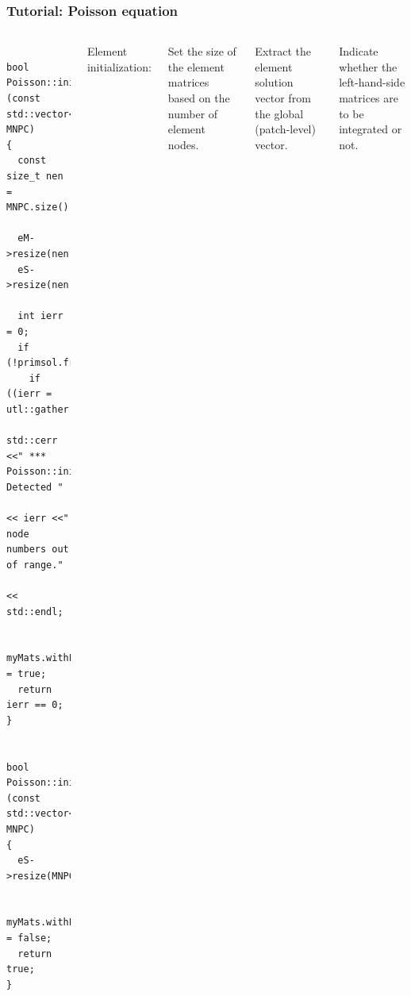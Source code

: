 \documentclass{beamer}
\begin{document}
\begin{frame}[fragile] %
 \frametitle{Tutorial: Poisson equation}

 \begin{columns}[c]
  \tiny\begin{verbatim}

bool Poisson::initElement (const std::vector<int>& MNPC)
{
  const size_t nen = MNPC.size();

  eM->resize(nen,nen,true);
  eS->resize(nen,true);

  int ierr = 0;
  if (!primsol.front().empty())
    if ((ierr = utl::gather(MNPC,1,primsol.front(),*eV)))
      std::cerr <<" *** Poisson::initElement: Detected "
                << ierr <<" node numbers out of range."
                << std::endl;

  myMats.withLHS = true;
  return ierr == 0;
}


bool Poisson::initElementBou (const std::vector<int>& MNPC)
{
  eS->resize(MNPC.size(),true);

  myMats.withLHS = false;
  return true;
}
  \end{verbatim}
  \small
  Element initialization:

  Set the size of the element matrices based on the number of element nodes.

  Extract the element solution vector from the global (patch-level) vector.

  Indicate whether the left-hand-side matrices are to be integrated or not.
 \end{columns}
\end{frame}
\end{document}

